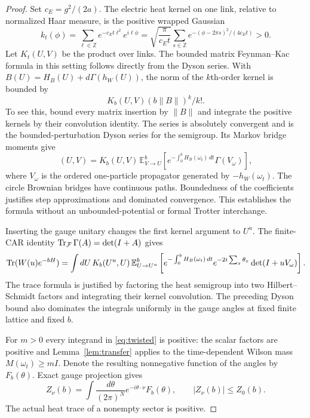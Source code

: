 \begin{proof}
Set $c_E=g^2/(2a)$. The electric heat kernel on one link,
relative to normalized Haar measure, is the positive wrapped Gaussian
\begin{equation}
 k_t(\phi)=\sum_{\ell\in\mathbb Z}e^{-c_Et\ell^2}e^{i\ell\phi}
 =\sqrt{\frac{\pi}{c_Et}}\sum_{s\in\mathbb Z}
             e^{-(\phi-2\pi s)^2/(4c_Et)}>0.
 \label{eq:heat}
\end{equation}
Let $K_t(U,V)$ be the product over links. The bounded matrix
Feynman--Kac formula in this setting follows directly from the
Dyson series. With $B(U)=H_B(U)+d\Gamma(h_W(U))$, the norm of
the $k$th-order kernel is bounded by
\[
 K_b(U,V)(b\|B\|)^k/k!.
\]
To see this, bound every matrix insertion by $\|B\|$ and
integrate the positive kernels by their convolution identity.
The series is absolutely convergent and is the bounded-perturbation
Dyson series for the semigroup. Its Markov bridge moments give
\begin{equation}
 [e^{-bH}](U,V)=K_b(U,V)\,
 \mathbb E_{V\to U}^{b}
 \left[e^{-\int_0^bH_B(\omega_t)\,dt}\Gamma(V_\omega)\right],
 \label{eq:fk}
\end{equation}
where $V_\omega$ is the ordered one-particle propagator generated
by $-h_W(\omega_t)$. The circle Brownian bridges have continuous
paths. Boundedness of the coefficients justifies step approximations
and dominated convergence. This establishes the formula without
an unbounded-potential or formal Trotter interchange.

Inserting the gauge unitary changes the first kernel argument
to $U^u$. The finite-CAR identity $\operatorname{Tr}_\mathcal F\Gamma(A)=\det(I+A)$ gives
\begin{align}
 \operatorname{Tr}(W(u)e^{-bH})
 =\int dU\,K_b(U^u,U)\,
 \mathbb E_{U\to U^u}^{b}
 \left[e^{-\int_0^bH_B(\omega_t)\,dt}
 e^{-2i\sum_x\theta_x}\det(I+uV_\omega)\right].
 \label{eq:twisted}
\end{align}
The trace formula is justified by factoring the heat semigroup
into two Hilbert--Schmidt factors and integrating their kernel
convolution. The preceding Dyson bound also dominates the
integrals uniformly in the gauge angles at fixed finite lattice
and fixed $b$.

For $m>0$ every integrand in \eqref{eq:twisted} is positive:
the scalar factors are positive and Lemma~\ref{lem:transfer}
applies to the time-dependent Wilson mass $M(\omega_t)\ge mI$.
Denote the resulting nonnegative function of the angles by
$F_b(\theta)$. Exact gauge projection gives
\[
 Z_\nu(b)=\int\frac{d\theta}{(2\pi)^N}
          e^{-i\theta\cdot\nu}F_b(\theta),\qquad
 |Z_\nu(b)|\le Z_0(b).
\]
The actual heat trace of a nonempty sector is positive.


\end{proof}
